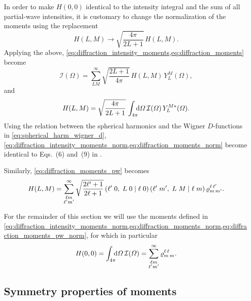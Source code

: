 In order to make $H(0, 0)$ identical to the intensity integral and the
sum of all partial-wave intensities, it is customary to change the
normalization of the moments using the replacement
\begin{equation}
  H(L, M)
  \to \sqrt{\frac{4 \pi}{2 L + 1}}\, H(L, M).
\end{equation}
Applying the above,
\cref{eq:diffraction_intensity_moments,eq:diffraction_moments} become
\begin{equation}
  \label{eq:diffraction_intensity_moments_norm}
  \mathcal{I}(\Omega)
  = \sum_{L M}^\infty \sqrt{\frac{2 L + 1}{4 \pi}}\, H(L, M)\, Y_L^M(\Omega),
\end{equation}
and
\begin{equation}
  \label{eq:diffraction_moments_norm}
  H(L, M)
  = \sqrt{\frac{4 \pi}{2 L + 1}}\, \int_{4 \pi}\!\!\! \dif{\Omega}\, \mathcal{I}(\Omega)\, Y_L^{M *}(\Omega).
\end{equation}
Using the relation between the spherical harmonics and the Wigner
$D$-functions in \cref{eq:spherical_harm_wigner_d},
\cref{eq:diffraction_intensity_moments_norm,eq:diffraction_moments_norm}
become identical to Eqs.~(6) and~(9) in .

Similarly, \cref{eq:diffraction_moments_pw} becomes
\begin{equation}
  \label{eq:diffraction_moments_pw_norm}
  H(L, M)
  = \sum_{\substack{\ell m \\ \ell' m'}}^\infty
  \sqrt{\frac{2 \ell' + 1}{2 \ell + 1}}\,
  ({\ell'}\;{0},\;{L}\;{0}\; |\; {\ell}\;{0})\, ({\ell'}\;{m'},\;{L}\;{M}\; |\; {\ell}\;{m})\,
  \varrho^{\ell\, \ell'}_{m\, m'}.
\end{equation}

For the remainder of this section we will use the moments defined in
\cref{eq:diffraction_intensity_moments_norm,eq:diffraction_moments_norm,eq:diffraction_moments_pw_norm}, for which in particular
\begin{equation}
  \label{eq:diffraction_moment_00_pw}
  H(0, 0)
  = \int_{4 \pi}\!\!\! \dif{\Omega}\, \mathcal{I}(\Omega)
  = \sum_{\substack{\ell m \\ \ell' m'}}^\infty \varrho^{\ell\, \ell}_{m\, m}.
\end{equation}


\subsection{Symmetry properties of moments}%
\label{sec:diffraction:moments_sym}

